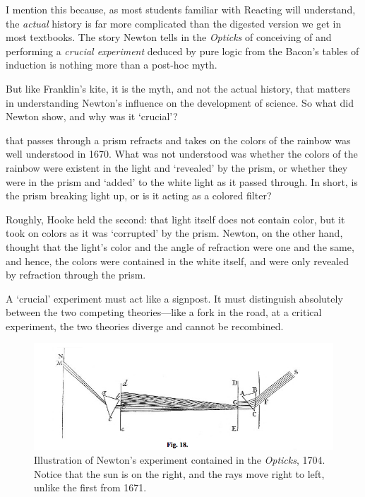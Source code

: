 \begin{refsection}
I mention this because, as most students familiar with Reacting will understand, the \emph{actual} history is far more complicated than the digested version we get in most textbooks. The story Newton tells in the \emph{Opticks} of conceiving of and performing a \emph{crucial experiment} deduced by pure logic from the Bacon's tables of induction is nothing more than a post-hoc myth.

But like Franklin's kite, it is the myth, and not the actual history, that matters in understanding Newton's influence on the development of science. So what did Newton show, and why was it `crucial'?

 that passes through a prism refracts and takes on the colors of the rainbow was well understood in 1670. What was not understood was whether the colors of the rainbow were existent in the light and `revealed' by the prism, or whether they were in the prism and `added' to the white light as it passed through. In short, is the prism breaking light up, or is it acting as a colored filter?

Roughly, Hooke held the second: that light itself does not contain color, but it took on colors as it was `corrupted' by the prism. Newton, on the other hand, thought that the light's color and the angle of refraction were one and the same, and hence, the colors were contained in the white itself, and were only revealed by refraction through the prism.

A `crucial' experiment must act like a signpost. It must distinguish absolutely between the two competing theories---like a fork in the road, at a critical experiment, the two theories diverge and cannot be recombined.
\begin{figure}\includegraphics{../images/newton1704.png}\caption{Illustration of Newton's experiment contained in the \emph{Opticks}, 1704. Notice that the sun is on the right, and the rays move right to left, unlike the first from 1671.}\label{fig:newton1704}\end{figure}


\end{refsection}
